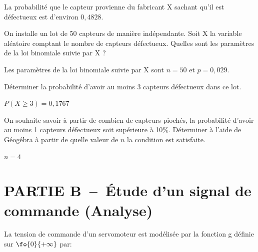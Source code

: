 \begin{enumerate}[resume=monDS]
\begin{blocvisiblex}[height=2.5]
        \smallskip
    La probabilité que le capteur provienne du fabricant X sachant qu'il est défectueux est d'environ $0,4828$.
     \end{blocvisiblex}
     \medskip
    \item On installe un lot de 50 capteurs de manière indépendante. Soit X la variable aléatoire comptant le nombre de capteurs défectueux. Quelles sont les paramètres de la loi binomiale suivie par X ?
    \begin{blocvisiblex}[height=1]
    {\quad}
        Les paramètres de la loi binomiale suivie par X sont $n=50$ et $p=0,029$.
    \end{blocvisiblex}
    \medskip
    \begin{minipage}{0.46\linewidth}
             \item Déterminer la probabilité d'avoir au moins 3 capteurs défectueux dans ce lot.
             \medskip
    \end{minipage}\hfill{}
    \begin{minipage}{0.46\linewidth}
    \begin{blocvisiblex}[height=1]
    {\quad}
    $P(X\geq 3)=0,1767$
    \end{blocvisiblex}
    \medskip
    \end{minipage}
\bigskip
    \begin{minipage}{0.66\linewidth}
    \item On souhaite savoir à partir de combien de capteurs piochés, la probabilité d'avoir au moins 1 capteurs défectueux soit supérieure à 10\%. Déterminer à l'aide de Géogébra à partir de quelle valeur de $n$ la condition est satisfaite.
    \end{minipage}\hfill{}
    \begin{minipage}{0.26\linewidth}
    \begin{blocvisiblex}[height=1]
    {\quad}
    $n=4$
    \end{blocvisiblex}
    \end{minipage}

        \appelprof{}

     \end{enumerate}

\bigskip

\section*{PARTIE B~--~Étude d'un signal de commande (Analyse)}

La tension de commande d'un servomoteur est modélisée par la fonction g définie sur $\fo{0}{+\infty}$ par:

